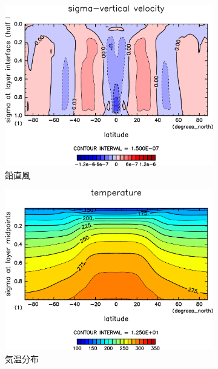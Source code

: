 \documentclass[body]{subfiles}
\begin{document}
\begin{figure}[t]
\begin{subfigure}{.4\textwidth}
		\includegraphics[width=\columnwidth]{S1500/SigDot,time=3650:4015-crop-rotate.pdf}
		\caption{鉛直風}\label{S1500鉛直風}
	\end{subfigure}
	\begin{subfigure}{.4\textwidth}
		\centering
		\includegraphics[width=\columnwidth]{S1500/Temp,time=3650:4015-crop-rotate.pdf}
		\caption{気温分布}\label{S1500気温分布}
	\end{subfigure}
	\begin{subfigure}{.4\textwidth}
		\centering

\end{subfigure}
\end{figure}
\end{document}

